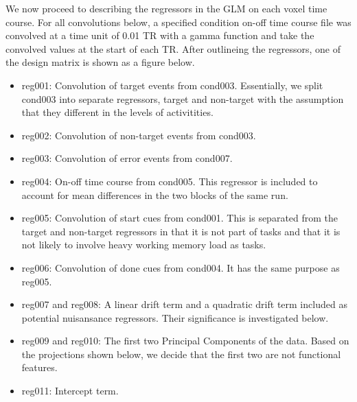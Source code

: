 \documentclass[11pt]{article}
\begin{document}
We now proceed to describing the regressors in the GLM on each voxel time
course. For all convolutions below, a specified condition on-off time course 
file was convolved at a time unit of 0.01 TR with a gamma function and take the
convolved values at the start of each TR. After outlineing the regressors, one 
of the design matrix is shown as a figure below.

\begin{itemize}
\item reg001: Convolution of target events from cond003. Essentially, we split cond003
into separate regressors, target and non-target with the assumption that they
different in the levels of activitities.

\item reg002: Convolution of non-target events from cond003.

\item reg003: Convolution of error events from cond007.

\item reg004: On-off time course from cond005. This regressor is included to account
for mean differences in the two blocks of the same run.

\item reg005: Convolution of start cues from cond001. This is separated from the
target and non-target regressors in that it is not part of tasks and that it is
not likely to involve heavy working memory load as tasks.

\item reg006: Convolution of done cues from cond004. It has the same purpose as
reg005.

\item reg007 and reg008: A linear drift term and a quadratic drift term included as
potential nuisansance regressors. Their significance is investigated below.

\item reg009 and reg010: The first two Principal Components of the data. Based on the
projections shown below, we decide that the first two are not functional
features.

\item reg011: Intercept term.

\end{itemize}
\end{document}
